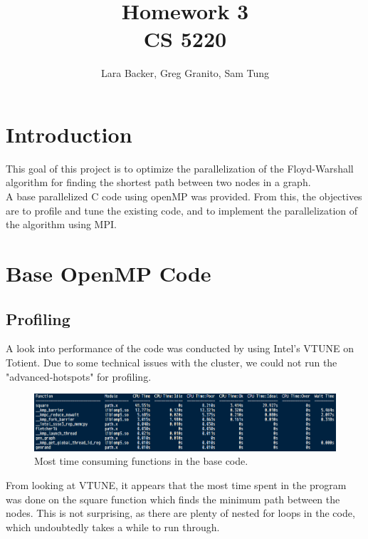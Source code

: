 \documentclass{article}
\begin{document}
\title{Homework 3 \\CS 5220}
\author{Lara Backer, Greg Granito, Sam Tung}

\maketitle

\section{Introduction}

This goal of this project is to optimize the parallelization of the Floyd-Warshall algorithm for finding the shortest path between two nodes in a graph. \\

A base parallelized C code using openMP was provided. From this, the objectives are to profile and tune the existing code, and to implement the parallelization of the algorithm using MPI.  

\section{Base OpenMP Code}

\subsection{Profiling}
A look into performance of the code was conducted by using Intel's VTUNE on Totient. Due to some technical issues with the cluster, we could not run the "advanced-hotspots" for profiling. 
	\begin{figure}[h!]
		\begin{center}
			\includegraphics[width=0.7\columnwidth]{amplxe}
			\caption{Most time consuming functions in the base code.}
			\label{amplxe}
		\end{center}
	\end{figure}
	
From looking at VTUNE, it appears that the most time spent in the program was done on the square function which finds the minimum path between the nodes. This is not surprising, as there are plenty of nested for loops in the code, which undoubtedly takes a while to run through.
\end{document}
